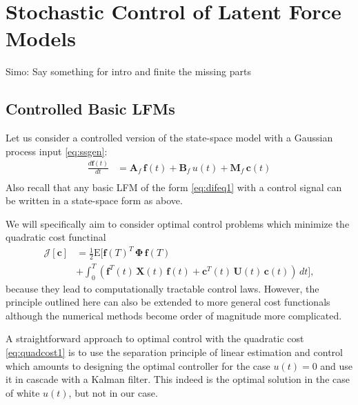 \documentclass[journal]{IEEEtran}
\newcommand{\simo}[1]{{\color{red}#1}}
\begin{document}
\section{Stochastic Control of Latent Force Models}
%

\simo{Simo: Say something for intro and finite the missing parts}

\subsection{Controlled Basic LFMs}
%
Let us consider a controlled version of the state-space model with a Gaussian process input \eqref{eq:ssgen}:
\begin{equation}
\begin{split}
  \frac{d\mathbf{f}(t)}{dt}
  &= \mathbf{A}_f \, \mathbf{f}(t) + \mathbf{B}_f \, u(t) + \mathbf{M}_f \, \mathbf{c}(t) \\
\end{split}
\end{equation}
%
Also recall that any basic LFM of the form \eqref{eq:difeq1} with a control signal can be written in a state-space form as above.

We will specifically aim to consider optimal control problems which minimize the quadratic cost functinal
%
\begin{equation}
\begin{split}
  \mathcal{J}[\mathbf{c}] &= \frac{1}{2} \mathrm{E} \Big[
    \mathbf{f}(T)^T \, \boldsymbol{\Phi} \, \mathbf{f}(T) \\
   &+ \int_0^T
   (\mathbf{f}^T(t) \, \mathbf{X}(t) \, \mathbf{f}(t)
  + \mathbf{c}^T(t) \, \mathbf{U}(t) \, \mathbf{c}(t)) \, dt \Big],
\end{split}
\label{eq:quadcost1}
\end{equation}
%
because they lead to computationally tractable control laws. However, the principle outlined here can also be extended to more general cost functionals although the numerical methods become order of magnitude more complicated.

A straightforward approach to optimal control with the quadratic cost \eqref{eq:quadcost1} is to use the separation principle of linear estimation and control which amounts to designing the optimal controller for the case $u(t) = 0$ and use it in cascade with a Kalman filter. This indeed is the optimal solution in the case of white $u(t)$, but not in our case.
\end{document}
